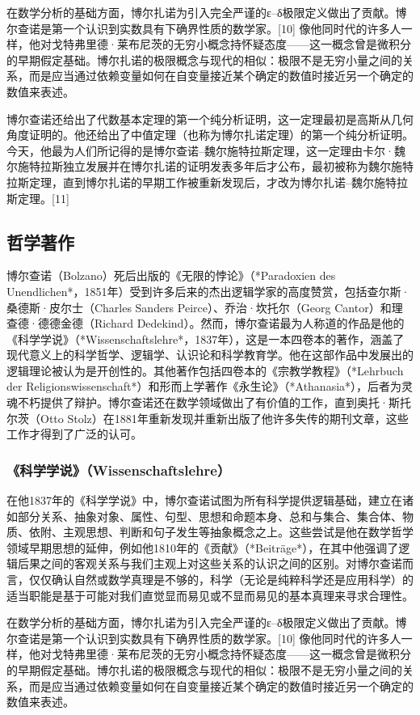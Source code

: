 在数学分析的基础方面，博尔扎诺为引入完全严谨的ε–δ极限定义做出了贡献。博尔查诺是第一个认识到实数具有下确界性质的数学家。[10] 像他同时代的许多人一样，他对戈特弗里德·莱布尼茨的无穷小概念持怀疑态度——这一概念曾是微积分的早期假定基础。博尔扎诺的极限概念与现代的相似：极限不是无穷小量之间的关系，而是应当通过依赖变量如何在自变量接近某个确定的数值时接近另一个确定的数值来表述。

博尔查诺还给出了代数基本定理的第一个纯分析证明，这一定理最初是高斯从几何角度证明的。他还给出了中值定理（也称为博尔扎诺定理）的第一个纯分析证明。今天，他最为人们所记得的是博尔查诺–魏尔施特拉斯定理，这一定理由卡尔·魏尔施特拉斯独立发展并在博尔扎诺的证明发表多年后才公布，最初被称为魏尔施特拉斯定理，直到博尔扎诺的早期工作被重新发现后，才改为博尔扎诺–魏尔施特拉斯定理。[11]
\subsection{哲学著作}  
博尔查诺（Bolzano）死后出版的《无限的悖论》（*Paradoxien des Unendlichen*，1851年）受到许多后来的杰出逻辑学家的高度赞赏，包括查尔斯·桑德斯·皮尔士（Charles Sanders Peirce）、乔治·坎托尔（Georg Cantor）和理查德·德德金德（Richard Dedekind）。然而，博尔查诺最为人称道的作品是他的《科学学说》（*Wissenschaftslehre*，1837年），这是一本四卷本的著作，涵盖了现代意义上的科学哲学、逻辑学、认识论和科学教育学。他在这部作品中发展出的逻辑理论被认为是开创性的。其他著作包括四卷本的《宗教学教程》（*Lehrbuch der Religionswissenschaft*）和形而上学著作《永生论》（*Athanasia*），后者为灵魂不朽提供了辩护。博尔查诺还在数学领域做出了有价值的工作，直到奥托·斯托尔茨（Otto Stolz）在1881年重新发现并重新出版了他许多失传的期刊文章，这些工作才得到了广泛的认可。
\subsubsection{《科学学说》（Wissenschaftslehre）}  
在他1837年的《科学学说》中，博尔查诺试图为所有科学提供逻辑基础，建立在诸如部分关系、抽象对象、属性、句型、思想和命题本身、总和与集合、集合体、物质、依附、主观思想、判断和句子发生等抽象概念之上。这些尝试是他在数学哲学领域早期思想的延伸，例如他1810年的《贡献》（*Beiträge*），在其中他强调了逻辑后果之间的客观关系与我们主观上对这些关系的认识之间的区别。对博尔查诺而言，仅仅确认自然或数学真理是不够的，科学（无论是纯粹科学还是应用科学）的适当职能是基于可能对我们直觉显而易见或不显而易见的基本真理来寻求合理性。

在数学分析的基础方面，博尔扎诺为引入完全严谨的ε–δ极限定义做出了贡献。博尔查诺是第一个认识到实数具有下确界性质的数学家。[10] 像他同时代的许多人一样，他对戈特弗里德·莱布尼茨的无穷小概念持怀疑态度——这一概念曾是微积分的早期假定基础。博尔扎诺的极限概念与现代的相似：极限不是无穷小量之间的关系，而是应当通过依赖变量如何在自变量接近某个确定的数值时接近另一个确定的数值来表述。

